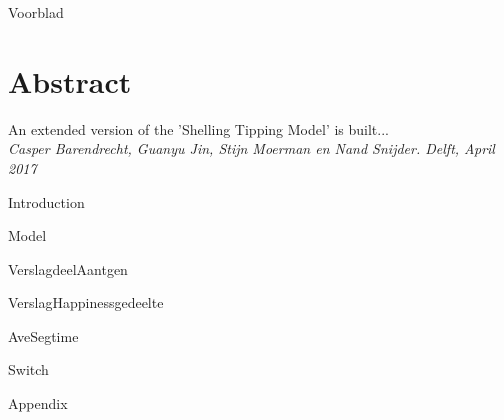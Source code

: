 \documentclass{article}
\begin{document}
{Voorblad}
\newpage


\section*{Abstract}
An extended version of the 'Shelling Tipping Model' is built...\\

\textit{Casper Barendrecht, Guanyu Jin, Stijn Moerman en Nand Snijder. Delft, April 2017}
\newpage

\tableofcontents
\newpage

{Introduction}
\newpage

{Model}
\newpage


\newpage

{VerslagdeelAantgen}
\newpage

{VerslagHappinessgedeelte}
\newpage

{AveSegtime}
\newpage

{Switch}
\newpage

{Appendix}
\newpage
\end{document}
